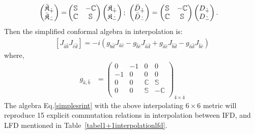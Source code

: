 \documentclass[%
 reprint,
superscriptaddress,
 amsmath,amssymb,
 aps,
]{revtex4-2}
\begin{document}
\begin{align}
    \begin{pmatrix}
        \Bar{\mathfrak{K}}_{\hat{+}}\\
        \Bar{\mathfrak{K}}_{\hat{-}}
    \end{pmatrix}=&\begin{pmatrix}
        \mathbb{S}&-\mathbb{C}\\
        \mathbb{C}&\mathbb{S}
    \end{pmatrix}\begin{pmatrix}
        \mathfrak{K}_{\hat{+}}\\
        \mathfrak{K}_{\hat{-}}
    \end{pmatrix};~\begin{pmatrix}
        \Bar{D}_{\hat{+}}\\
        \Bar{D}_{\hat{-}}
    \end{pmatrix}=\begin{pmatrix}
        \mathbb{S}&-\mathbb{C}\\
        \mathbb{C}&\mathbb{S}
    \end{pmatrix}\begin{pmatrix}
        D_{\hat{+}}\\
        D_{\hat{-}}
    \end{pmatrix}.
\end{align}
Then the simplified conformal algebra in interpolation is:
  \begin{align}
      \left[J_{{\hat{a}}{\hat{b}}}J_{{\hat{c}}{\hat{d}}}\right]=-i\left(g_{{\hat{b}}{\hat{d}}}J_{{\hat{a}}{\hat{c}}}-g_{{\hat{b}}{\hat{c}}}J_{{\hat{a}}{\hat{d}}}+g_{{\hat{a}}{\hat{c}}}J_{{\hat{b}}{\hat{d}}}-g_{{\hat{a}}{\hat{d}}}J_{{\hat{b}}{\hat{c}}}\right)\label{simplesrint}
  \end{align}
where, 
\begin{align}
    g_{\hat{a},\hat{b}}&=\begin{pmatrix}
  0&-1&0&0\\
  -1&0&0&0\\
  0&0&\mathbb{C}&\mathbb{S}\\
  0&0&\mathbb{S}&-\mathbb{C}\\
  \end{pmatrix}_{4\times4}\label{metricghat}
\end{align}
The algebra Eq.\eqref{simplesrint} with the above interpolating $6\times6$ metric will reproduce 15 explicit commutation relations in interpolation between IFD, and LFD mentioned in Table~\ref {tabel1+1interpolationlfd}.
\end{document}
